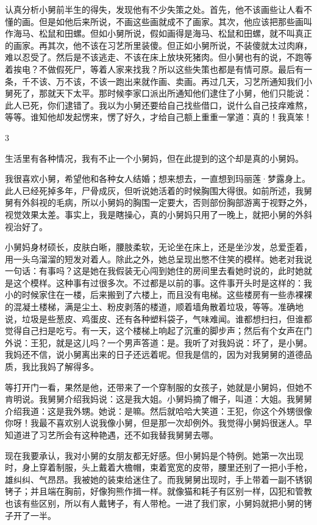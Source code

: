 认真分析小舅前半生的得失，发现他有不少失策之处。首先，他不该画些让人看不懂的画。但是如他后来所说，不画这些画就成不了画家。其次，他应该把那些画叫作海马、松鼠和田螺。但如小舅所说，假如画得是海马、松鼠和田螺，就不叫真正的画家。再其次，他不该在习艺所里装傻。但正如小舅所说，不装傻就太过肉麻，难以忍受了。然后是不该逃走、不该在床上放块死猪肉。但小舅也有的说，不跑等着挨电？不做假死尸，等着人家来找我？所以这些失策也都是有情可原。最后有一条，千不该、万不该，不该一跑出来就作画、卖画。再过几天，习艺所通知我们小舅死了，那就天下太平。那时候李家口派出所通知他们逮住了小舅，他们只能说：此人已死，你们逮错了。我以为小舅还要给自己找些借口，说什么自己技痒难熬，等等。谁知他却发起愣来，愣了好久，才给自己额上重重一掌道：真的！我真笨！

3 

生活里有各种情况，我有不止一个小舅妈，但在此提到的这个却是真的小舅妈。 

我很喜欢小舅，希望他和各种女人结婚；想来想去，一直想到玛丽莲·梦露身上。此人已经死掉多年，尸骨成灰，但听说她活着的时候胸围大得很。如前所述，我舅舅有外斜视的毛病，所以小舅妈的胸围一定要大，否则部份胸部游离于视野之外，视觉效果太差。事实上，我是瞎操心，真的小舅妈只用了一晚上，就把小舅的外斜视治好了。 

小舅妈身材硕长，皮肤白晰，腰肢柔软，无论坐在床上，还是坐沙发，总爱歪着，用一头乌溜溜的短发对着人。除此之外，她总呈现出憋不住笑的模样。她老对我说一句话：有事吗？这是她在我假装无心闯到她住的房间里去看她时说的，此时她就是这个模样。这种事有过很多次。不过都是以前的事。这件事开头时是这样的：我小的时候家住在一楼，后来搬到了六楼上，而且没有电梯。这些楼房有一些赤裸裸的混凝土楼梯，满是尘土、粉皮剥落的楼道，顺着墙角散着垃圾，等等。准确地说，垃圾是些葱皮、鸡蛋皮、还有各种塑料袋子，气味难闻。谁都想扫扫，但谁都觉得自己扫是吃亏。有一天，这个楼梯上响起了沉重的脚步声；然后有个女声在门外说：王犯，就是这儿吗？一个男声答道：是。我听了对我妈说：坏了，是小舅。我妈还不信，说小舅离出来的日子还远着呢。但我是信的，因为对我舅舅的道德品质，我比我妈了解得多。 

等打开门一看，果然是他，还带来了一个穿制服的女孩子，她就是小舅妈，但她不肯明说。我舅舅介绍我妈说：这是我大姐。小舅妈摘了帽子，叫道：大姐。我舅舅介绍我道：这是我外甥。她说：是嘛。然后就哈哈大笑道：王犯，你这个外甥很像你呀！我最不喜欢别人说我像小舅，但是那一次却例外。我觉得小舅妈很迷人。早知道进了习艺所会有这种艳遇，还不如我替我舅舅去哪。 

现在我要承认，我对小舅的女朋友都无好感。但小舅妈是个特例。她第一次出现时，身上穿着制服，头上戴着大檐帽，束着宽宽的皮带，腰里还别了一把小手枪，雄纠纠、气昂昂。我被她的装束给迷住了。而我舅舅出现时，手上带着一副不锈钢铐子；并且端在胸前，好像狗熊作揖一样。就像猫和耗子有区别一样，囚犯和管教也该有些区别，所以有人戴铐子，有人带枪。一进了我们家，小舅妈就把小舅的铐子开了一半。 

